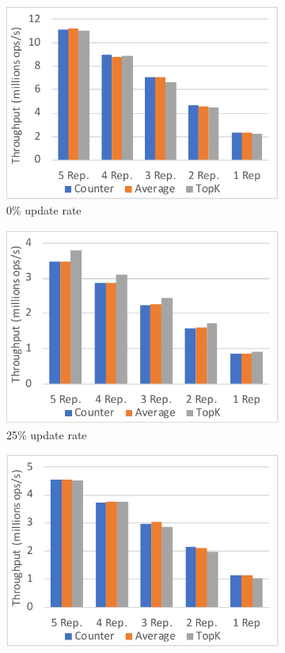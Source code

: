 \documentclass{vldb}
\begin{document}
\begin{figure}
	\centering
	\begin{subfigure}{.33\linewidth}
		\centering
		\includegraphics[width=.97\linewidth]{CounterAvgTopK0upd_v2_cut}
		\caption{0\% update rate}
		\label{fig:CounterAvgTopK0upd}
	\end{subfigure}%
	\begin{subfigure}{.33\linewidth}
		\centering
		\includegraphics[width=.97\linewidth]{CounterAvgTopK25upd_v2_cut}
		\caption{25\% update rate}
		\label{fig:CounterAvgTopK25upd}
	\end{subfigure}%
	\begin{subfigure}{.33\linewidth}
	\centering
	\includegraphics[width=.97\linewidth]{CounterAvgTopK100upd_v2_cut}

\end{subfigure}
\end{figure}
\end{document}
